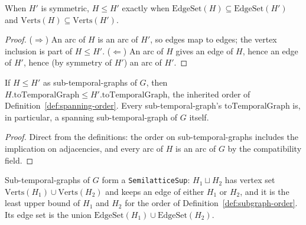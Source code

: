 \begin{lemma}
  \label{lem:subgraph-le-iff-edgeSet-verts}
  \leanok
  When $H'$ is symmetric, $H \le H'$ exactly when
  $\mathrm{EdgeSet}(H) \subseteq \mathrm{EdgeSet}(H')$ and
  $\mathrm{Verts}(H) \subseteq \mathrm{Verts}(H')$.
\end{lemma}

\begin{proof}
  \leanok
  ($\Rightarrow$) An arc of $H$ is an arc of $H'$, so edges map to edges; the vertex inclusion is part of $H \le H'$. ($\Leftarrow$) An arc of $H$ gives an edge of $H$, hence an edge of $H'$, hence (by symmetry of $H'$) an arc of $H'$.
\end{proof}

\begin{lemma}
  \label{lem:toTemporalGraph-le}
  \leanok
  If $H \le H'$ as sub-temporal-graphs of $G$, then
  $H.\mathrm{toTemporalGraph} \le H'.\mathrm{toTemporalGraph}$, the inherited
  order of Definition~\ref{def:spanning-order}. Every sub-temporal-graph's
  $\mathrm{toTemporalGraph}$ is, in particular, a spanning sub-temporal-graph
  of $G$ itself.
\end{lemma}

\begin{proof}
  \leanok
  Direct from the definitions: the order on sub-temporal-graphs includes the implication on adjacencies, and every arc of $H$ is an arc of $G$ by the compatibility field.
\end{proof}

\begin{definition}
  \label{def:subgraph-sup}
  \leanok
  Sub-temporal-graphs of $G$ form a \texttt{SemilatticeSup}: $H_1 \sqcup H_2$
  has vertex set $\mathrm{Verts}(H_1) \cup \mathrm{Verts}(H_2)$ and keeps an
  edge of either $H_1$ or $H_2$, and it is the least upper bound of $H_1$
  and $H_2$ for the order of Definition~\ref{def:subgraph-order}. Its edge
  set is the union $\mathrm{EdgeSet}(H_1) \cup \mathrm{EdgeSet}(H_2)$.
\end{definition}

